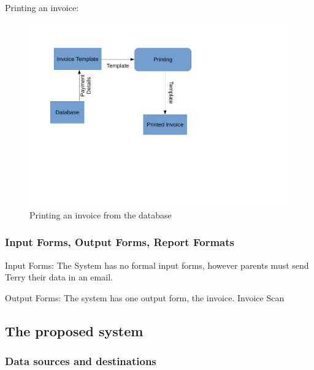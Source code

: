 Printing an invoice:
\begin{figure}[H]
    \includegraphics[width=\textwidth]{./Analysis/Images/Data_Flow_Printing_Invoice.pdf}
    \caption{Printing an invoice from the database} \label{fig:printt_invoice}
\end{figure}

\subsubsection{Input Forms, Output Forms, Report Formats}
Input Forms:
The System has no formal input forms, however parents must send Terry their data in an email.

Output Forms:
The system has one output form, the invoice.
{Invoice Scan}


\subsection{The proposed system}

\subsubsection{Data sources and destinations}

